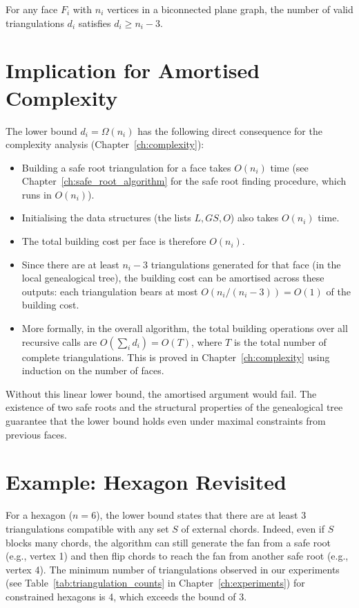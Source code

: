 \begin{corollary}
    For any face \(F_i\) with \(n_i\) vertices in a biconnected plane graph, the number of valid triangulations \(d_i\) satisfies \(d_i \ge n_i - 3\).
\end{corollary}

\section{Implication for Amortised Complexity}
\label{sec:lower_amortised}

The lower bound \(d_i = \Omega(n_i)\) has the following direct consequence for the complexity analysis (Chapter~\ref{ch:complexity}):

\begin{itemize}
    \item Building a safe root triangulation for a face takes \(O(n_i)\) time (see Chapter~\ref{ch:safe_root_algorithm} for the safe root finding procedure, which runs in \(O(n_i)\)).
    \item Initialising the data structures (the lists \(L, GS, O\)) also takes \(O(n_i)\) time.
    \item The total building cost per face is therefore \(O(n_i)\).
    \item Since there are at least \(n_i - 3\) triangulations generated for that face (in the local genealogical tree), the building cost can be amortised across these outputs: each triangulation bears at most \(O(n_i / (n_i - 3)) = O(1)\) of the building cost.
    \item More formally, in the overall algorithm, the total building operations over all recursive calls are \(O(\sum_i d_i) = O(T)\), where \(T\) is the total number of complete triangulations. 
    This is proved in Chapter~\ref{ch:complexity} using induction on the number of faces.
\end{itemize}

Without this linear lower bound, the amortised argument would fail. 
The existence of two safe roots and the structural properties of the genealogical tree guarantee that the lower bound holds even under maximal constraints from previous faces.

\section{Example: Hexagon Revisited}
\label{sec:lower_example}

For a hexagon (\(n = 6\)), the lower bound states that there are at least \(3\) triangulations compatible with any set \(S\) of external chords. 
Indeed, even if \(S\) blocks many chords, the algorithm can still generate the fan from a safe root (e.g., vertex 1) and then flip chords to reach the fan from another safe root (e.g., vertex 4). 
The minimum number of triangulations observed in our experiments (see Table~\ref{tab:triangulation_counts} in Chapter~\ref{ch:experiments}) for constrained hexagons is 4, which exceeds the bound of 3.

